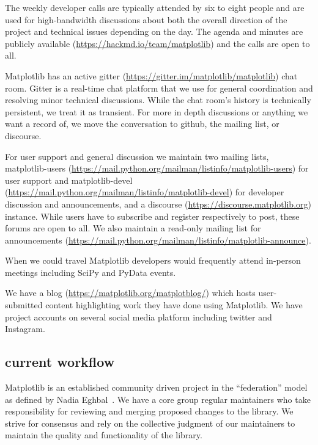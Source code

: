 \documentclass[12pt]{article}
\numberwithin{page}{section}
\begin{document}
The weekly developer calls are typically attended by six to eight
people and are used for high-bandwidth discussions about both the
overall direction of the project and technical issues depending on the
day.  The agenda and minutes are publicly available
(\url{https://hackmd.io/team/matplotlib}) and the calls are open to
all.

Matplotlib has an active gitter
(\url{https://gitter.im/matplotlib/matplotlib}) chat room.  Gitter is
a real-time chat platform that we use for general coordination and
resolving minor technical discussions.  While the chat room's history
is technically persistent, we treat it as transient.  For more in
depth discussions or anything we want a record of, we move the
conversation to github, the mailing list, or discourse.

For user support and general discussion we maintain two mailing lists,
matplotlib-users
(\url{https://mail.python.org/mailman/listinfo/matplotlib-users}) for
user support and matplotlib-devel
(\url{https://mail.python.org/mailman/listinfo/matplotlib-devel}) for
developer discussion and announcements, and a discourse
(\url{https://discourse.matplotlib.org}) instance.  While users have
to subscribe and register respectively to post, these forums are open
to all.  We also maintain a read-only mailing list for announcements
(\url{https://mail.python.org/mailman/listinfo/matplotlib-announce}).

When we could travel Matplotlib developers would frequently attend
in-person meetings including SciPy and PyData events.

We have a blog (\url{https://matplotlib.org/matplotblog/}) which hosts
user-submitted content highlighting work they have done using
Matplotlib.  We have project accounts on several social media platform
including twitter and Instagram.


\subsection{current workflow}


Matplotlib is an established community driven project in the
``federation'' model as defined by Nadia Eghbal~\cite{eghbal_2020}.  We
have a core group regular maintainers who take responsibility for
reviewing and merging proposed changes to the library.  We strive for
consensus and rely on the collective judgment of our maintainers to maintain
the quality and functionality of the library.
\end{document}
